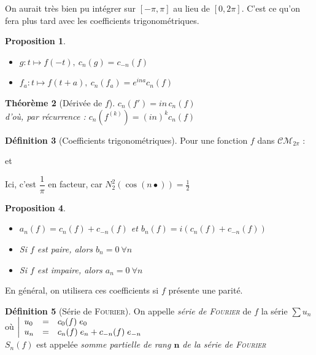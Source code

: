 \documentclass[11pt,a4paper]{report}
\newtheorem{theorem}{Théorème}[chapter]
\newtheorem{prop}[theorem]{Proposition}
\theoremstyle{definition}
\newtheorem{dfn}[theorem]{Définition}
\begin{document}
On aurait très bien pu intégrer sur $[-\pi,\pi]$ au lieu de $[0,2\pi]$. C'est ce qu'on fera plus tard avec les coefficients trigonométriques.
\begin{prop}
\begin{itemize}
\item $g : t \mapsto f(-t),\: c_n(g) = c_{-n}(f)$
\item $f_a : t \mapsto f(t + a),\: c_n(f_a) = e^{ina}c_n(f)$
\end{itemize}
\end{prop}
\begin{theorem}[Dérivée de $f$]
$c_n(f') = in\, c_n(f)$ \\
d'où, par récurrence : $\boxed{c_n\left( f^{(k)}\right) = (in)^k c_n(f)}$
\end{theorem}
\begin{dfn}[Coefficients trigonométriques]
Pour une fonction $f$ dans $\mathcal{CM}_{2\pi}$ :\\
\begin{center}
  et  
 \end{center}
Ici, c'est $\dfrac{1}{\pi}$ en facteur, car $N_2^2 \left( \cos(n \bullet)\right) = \frac{1}{2}$

\end{dfn}
\begin{prop}
\begin{itemize}
\item $a_n(f) = c_n(f) + c_{-n}(f)$ et $b_n(f) = i(c_n(f) + c_{-n}(f))$
\item Si $f$ est paire, alors $b_n = 0 \: \forall n$
\item Si $f$ est impaire, alors $a_n = 0 \: \forall n$
\end{itemize}
\end{prop}
En général, on utilisera ces coefficients si $f$ présente une parité.
\begin{dfn}[Série de \textsc{Fourier}]
On appelle \emph{série de \textsc{Fourier}} de $f$ la série $\sum u_n$ où $\left|
\begin{array}{l l l l}
u_0 &=& c_0(f) \; e_0&\\
u_n &=& c_n(f) \; e_n + c_{-n}(f) \; e_{-n}
\end{array}
\right.$\\
$S_n(f)$ est appelée \emph{somme partielle de rang $\boldsymbol n$ de la série de \textsc{Fourier}}
\end{dfn}
\end{document}
